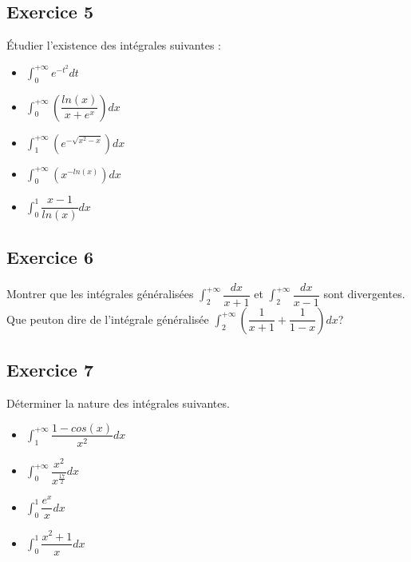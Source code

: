 \documentclass[letterpaper,10pt,french]{sphinxmanual}
\begin{document}
\subsection{Exercice 5}
\label{\detokenize{exo3:exercice-5}}
\sphinxAtStartPar
Étudier l’existence des intégrales suivantes :
\begin{itemize}
\item {} 
\sphinxAtStartPar
\(\int_0^{+\infty} e^{-t^2}dt\)

\item {} 
\sphinxAtStartPar
\(\int_0^{+\infty} (\dfrac{ln(x)}{x+e^x})dx\)

\item {} 
\sphinxAtStartPar
\(\int_1^{+\infty} (e^{-\sqrt{x^2-x}})dx\)

\item {} 
\sphinxAtStartPar
\(\int_0^{+\infty} (x^{-ln(x )})dx\)

\item {} 
\sphinxAtStartPar
\(\int_0^{1} \dfrac{x-1}{ln(x)}dx\)

\end{itemize}


\subsection{Exercice 6}
\label{\detokenize{exo3:exercice-6}}
\sphinxAtStartPar
Montrer que les intégrales généralisées \(\int_2^{+\infty}\dfrac{dx}{x+1}\) et \(\int_2^{+\infty}\dfrac{dx}{x-1}\) sont divergentes. Que peut\sphinxhyphen{}on dire de l’intégrale généralisée
\(\int_2^{+\infty}(\dfrac{1}{x+1}+\dfrac{1}{1-x})dx\)?


\subsection{Exercice 7}
\label{\detokenize{exo3:exercice-7}}
\sphinxAtStartPar
Déterminer la nature des intégrales suivantes.
\begin{itemize}
\item {} 
\sphinxAtStartPar
\(\int_1^{+\infty} \dfrac{1-cos(x)}{x^2}dx\)

\item {} 
\sphinxAtStartPar
\(\int_0^{+\infty} \dfrac{x^2}{x^{\frac{17}{2}}}dx\)

\item {} 
\sphinxAtStartPar
\(\int_0^{1} \dfrac{e^x}{x}dx\)

\item {} 
\sphinxAtStartPar
\(\int_0^{1} \dfrac{x^2+1}{x}dx\)

\end{itemize}
\end{document}
